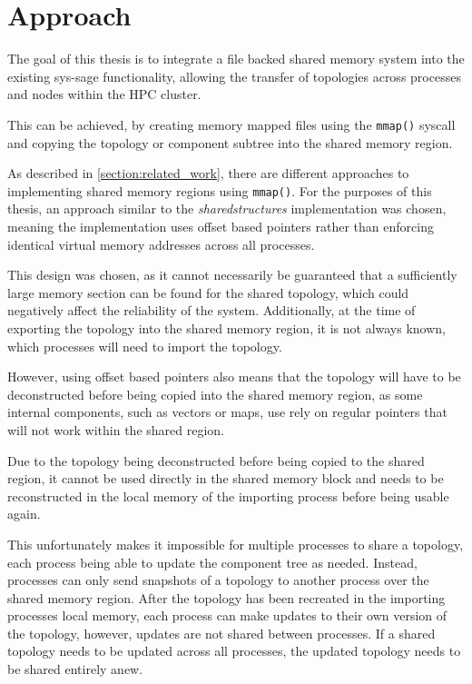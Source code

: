 \chapter{Approach}\label{chapter:evaluation}
The goal of this thesis is to integrate a file backed shared memory system into the existing sys-sage functionality,
allowing the transfer of topologies across processes and nodes within the HPC cluster.

This can be achieved, by creating memory mapped files using the \lstinline{mmap()} syscall and copying the topology or component subtree into the shared memory region.

As described in \autoref{section:related_work}, there are different approaches to implementing shared memory regions using \lstinline{mmap()}. For the purposes of this thesis,
an approach similar to the \emph{sharedstructures} implementation was chosen, meaning the implementation uses offset based pointers rather than enforcing identical virtual memory addresses across all processes.

This design was chosen, as it cannot necessarily be guaranteed that a sufficiently large memory section can be found for the shared topology, which could negatively affect the reliability of the system.
Additionally, at the time of exporting the topology into the shared memory region, it is not always known, which processes will need to import the topology.

However, using offset based pointers also means that the topology will have to be deconstructed before being copied into the shared memory region, as some internal components, such as vectors or maps,
use rely on regular pointers that will not work within the shared region.

Due to the topology being deconstructed before being copied to the shared region,
it cannot be used directly in the shared memory block and needs to be reconstructed in the local memory of the importing process before being usable again.

This unfortunately makes it impossible for multiple processes to share a topology, each process being able to update the component tree as needed.
Instead, processes can only send snapshots of a topology to another process over the shared memory region. After the topology has been recreated in the importing processes local memory,
each process can make updates to their own version of the topology, however, updates are not shared between processes. If a shared topology needs to be updated across all processes,
the updated topology needs to be shared entirely anew.


